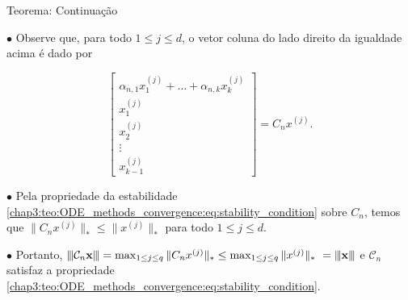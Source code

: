 \documentclass{beamer}
\newcommand{\vertiii}[1]{{\left\vert\kern-0.25ex\left\vert\kern-0.25ex\left\vert #1 
    \right\vert\kern-0.25ex\right\vert\kern-0.25ex\right\vert}}
\theoremstyle{plain}
\theoremstyle{definition}
\begin{document}

\begin{frame}{Teorema: Continuação}
    \small

    \phantom{aa} $\bullet$ Observe que, para todo $1 \leq j \leq d$, o vetor coluna do lado direito da igualdade acima é dado por

    \[
        \begin{bmatrix}
          \alpha_{n,1}x_1 ^{(j)} + \dots + \alpha_{n, k} x_k^{(j)} \\
          x_1^{(j)} \\
          x_2 ^{(j)}\\
          \vdots \\
          x_{k-1}^{(j)}
        \end{bmatrix}
        = 
          C_n x^{(j)}.
    \]

    \phantom{aa} $\bullet$ Pela propriedade da estabilidade \eqref{chap3:teo:ODE_methods_convergence:eq:stability_condition} sobre $C_n$, temos que $\| C_n x^{(j)} \|_* \leq \| x^{(j)} \|_*$ para todo $1 \leq j \leq d$.


    \vspace{0.2cm}
    \phantom{aa} $\bullet$ Portanto, \(\vertiii{ \mathcal{C}_{n} \mathbf{x}} =  \max_{1 \leq j \leq q} \| C_n x^{(j)} \|_* \leq \max_{1 \leq j \leq q} \| x^{(j)} \|_*\ = \vertiii{ \mathbf{x} }\) e \(\mathcal{C}_{n}\) satisfaz a propriedade \eqref{chap3:teo:ODE_methods_convergence:eq:stability_condition}.

\end{frame}

\end{document}
